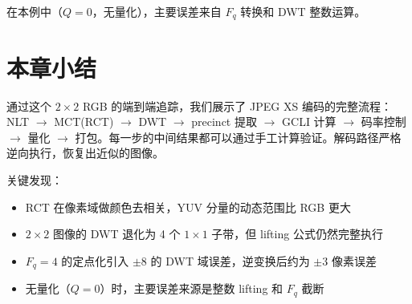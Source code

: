在本例中（$Q=0$，无量化），主要误差来自 $F_q$ 转换和 DWT 整数运算。

\section{本章小结}

通过这个 $2\times2$ RGB 的端到端追踪，我们展示了 JPEG XS 编码的完整流程：NLT $\to$ MCT(RCT) $\to$ DWT $\to$ precinct 提取 $\to$ GCLI 计算 $\to$ 码率控制 $\to$ 量化 $\to$ 打包。每一步的中间结果都可以通过手工计算验证。解码路径严格逆向执行，恢复出近似的图像。

关键发现：
\begin{itemize}
  \item RCT 在像素域做颜色去相关，YUV 分量的动态范围比 RGB 更大
  \item $2\times2$ 图像的 DWT 退化为 4 个 $1\times1$ 子带，但 lifting 公式仍然完整执行
  \item $F_q = 4$ 的定点化引入 $\pm 8$ 的 DWT 域误差，逆变换后约为 $\pm 3$ 像素误差
  \item 无量化（$Q=0$）时，主要误差来源是整数 lifting 和 $F_q$ 截断
\end{itemize}

